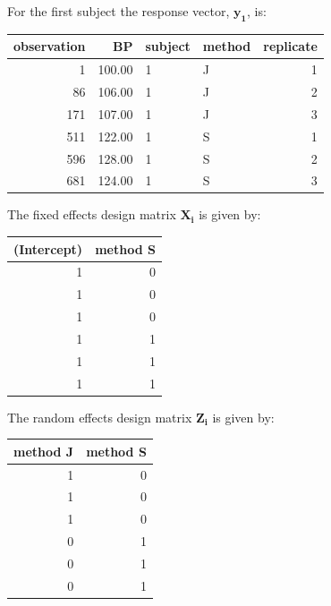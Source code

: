 \documentclass[12pt, a4paper]{report}
\theoremstyle{plain}
\theoremstyle{definition}
\theoremstyle{remark}
\begin{document}
	For the first subject the response vector, $\boldsymbol{y_{1}}$, is:
	\begin{table}[ht]
		\begin{center}
			\begin{tabular}{rrllr}
				\hline
				observation & BP & subject & method & replicate \\
				\hline
				1 & 100.00 & 1 & J &   1 \\
				86 & 106.00 & 1 & J &   2 \\
				171 & 107.00 & 1 & J &   3 \\
				511 & 122.00 & 1 & S &   1 \\
				596 & 128.00 & 1 & S &   2 \\
				681 & 124.00 & 1 & S &   3 \\
				\hline
			\end{tabular}
		\end{center}
	\end{table}
	\newpage
	The fixed effects design matrix $\boldsymbol{X_{i}}$ is given by:
	\begin{table}[ht]
		\begin{center}
			\begin{tabular}{r|r}
				\hline
				(Intercept) & method S \\
				\hline
				1 & 0 \\
				1 & 0 \\
				1 & 0 \\
				1 & 1 \\
				1 & 1 \\
				1 & 1 \\
				\hline
			\end{tabular}
		\end{center}
	\end{table}
	
	
	\newpage
	
	
	
	
	
	
	
	The random effects design matrix $\boldsymbol{Z_{i}}$ is given by:
	\begin{table}[ht]
		\begin{center}
			\begin{tabular}{r|r}
				\hline
				method J & method S \\
				\hline
				1 & 0 \\
				1 & 0 \\
				1 & 0 \\
				0 & 1 \\
				0 & 1 \\
				0 & 1 \\
				\hline
			\end{tabular}
		\end{center}
	\end{table}
	
\end{document}
